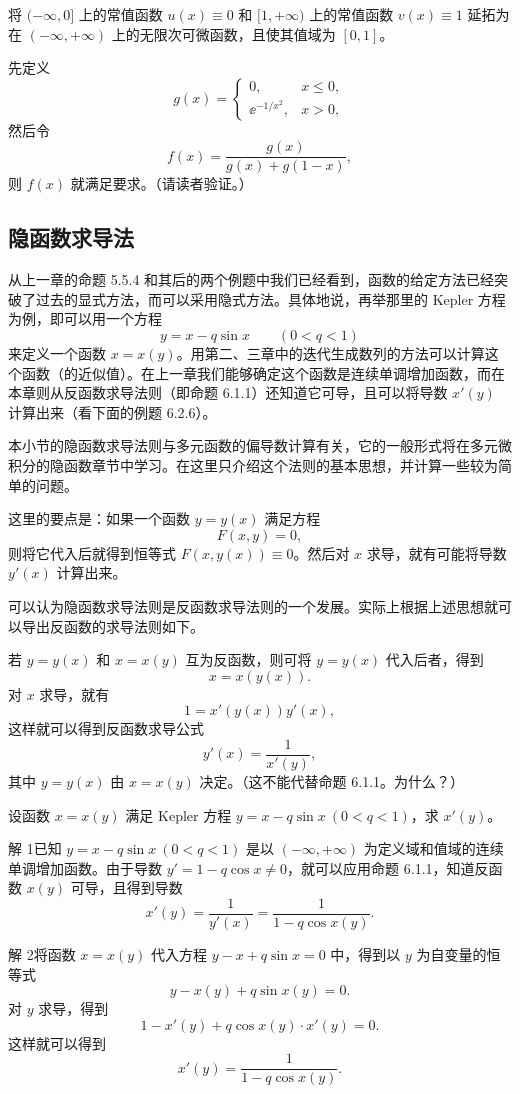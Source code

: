 \begin{xexample}[6.2.5]
将 $(-\infty,0]$ 上的常值函数 $u(x)\equiv0$ 和 $[1,+\infty)$ 上的常值函数 $v(x)\equiv1$ 延拓为在 $(-\infty,+\infty)$ 上的无限次可微函数，且使其值域为 $[0,1]$。
\end{xexample}
\begin{xsolution}
先定义
\[
  g(x)=
  \begin{cases}
    0, & x\le0,\\
    \ee^{-1/x^2}, & x>0,
  \end{cases}
\]
然后令
\[
  f(x)=\frac{g(x)}{g(x)+g(1-x)},
\]
则 $f(x)$ 就满足要求。（请读者验证。）
\end{xsolution}

\subsection{隐函数求导法}

从上一章的命题 5.5.4 和其后的两个例题中我们已经看到，函数的给定方法已经突破了过去的显式方法，而可以采用隐式方法。具体地说，再举那里的 Kepler 方程为例，即可以用一个方程
\[
  y=x-q\sin x\qquad(0<q<1)
\]
来定义一个函数 $x=x(y)$。用第二、三章中的迭代生成数列的方法可以计算这个函数（的近似值）。在上一章我们能够确定这个函数是连续单调增加函数，而在本章则从反函数求导法则（即命题 6.1.1）还知道它可导，且可以将导数 $x'(y)$ 计算出来（看下面的例题 6.2.6）。

本小节的隐函数求导法则与多元函数的偏导数计算有关，它的一般形式将在多元微积分的隐函数章节中学习。在这里只介绍这个法则的基本思想，并计算一些较为简单的问题。

这里的要点是：如果一个函数 $y=y(x)$ 满足方程
\[
  F(x,y)=0,
\]
则将它代入后就得到恒等式 $F(x,y(x))\equiv0$。然后对 $x$ 求导，就有可能将导数 $y'(x)$ 计算出来。

可以认为隐函数求导法则是反函数求导法则的一个发展。实际上根据上述思想就可以导出反函数的求导法则如下。

若 $y=y(x)$ 和 $x=x(y)$ 互为反函数，则可将 $y=y(x)$ 代入后者，得到
\[
  x=x(y(x)).
\]
对 $x$ 求导，就有
\[
  1=x'(y(x))y'(x),
\]
这样就可以得到反函数求导公式
\[
  y'(x)=\frac1{x'(y)},
\]
其中 $y=y(x)$ 由 $x=x(y)$ 决定。（这不能代替命题 6.1.1。为什么？）

\begin{xexample}[6.2.6]
设函数 $x=x(y)$ 满足 Kepler 方程 $y=x-q\sin x\ (0<q<1)$，求 $x'(y)$。
\end{xexample}
\begin{xsolution}
解 1\quad 已知 $y=x-q\sin x\ (0<q<1)$ 是以 $(-\infty,+\infty)$ 为定义域和值域的连续单调增加函数。由于导数 $y'=1-q\cos x\ne0$，就可以应用命题 6.1.1，知道反函数 $x(y)$ 可导，且得到导数
\[
  x'(y)=\frac1{y'(x)}=\frac1{1-q\cos x(y)}.
\]

解 2\quad 将函数 $x=x(y)$ 代入方程 $y-x+q\sin x=0$ 中，得到以 $y$ 为自变量的恒等式
\[
  y-x(y)+q\sin x(y)=0.
\]
对 $y$ 求导，得到
\[
  1-x'(y)+q\cos x(y)\cdot x'(y)=0.
\]
这样就可以得到
\[
  x'(y)=\frac1{1-q\cos x(y)}.
\]
\end{xsolution}

